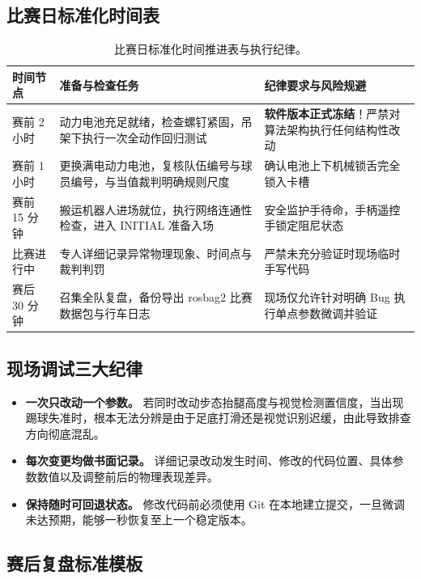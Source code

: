 \subsection{比赛日标准化时间表}

\begin{table}[H]
\centering
\small
\begin{tabularx}{\textwidth}{p{2.6cm} p{5.2cm} X}
\toprule
\textbf{时间节点} & \textbf{准备与检查任务} & \textbf{纪律要求与风险规避} \\
\midrule
赛前 2 小时 & 动力电池充足就绪，检查螺钉紧固，吊架下执行一次全动作回归测试 & \textbf{软件版本正式冻结}！严禁对算法架构执行任何结构性改动 \\
\addlinespace
赛前 1 小时 & 更换满电动力电池，复核队伍编号与球员编号，与当值裁判明确规则尺度 & 确认电池上下机械锁舌完全锁入卡槽 \\
\addlinespace
赛前 15 分钟 & 搬运机器人进场就位，执行网络连通性检查，进入 INITIAL 准备入场 & 安全监护手待命，手柄遥控手锁定阻尼状态 \\
\addlinespace
比赛进行中 & 专人详细记录异常物理现象、时间点与裁判判罚 & 严禁未充分验证时现场临时手写代码 \\
\addlinespace
赛后 30 分钟 & 召集全队复盘，备份导出 rosbag2 比赛数据包与行车日志 & 现场仅允许针对明确 Bug 执行单点参数微调并验证 \\
\bottomrule
\end{tabularx}
\caption{比赛日标准化时间推进表与执行纪律。\advice}
\end{table}

\subsection{现场调试三大纪律}

\begin{itemize}[leftmargin=*]
    \item \textbf{一次只改动一个参数。} 若同时改动步态抬腿高度与视觉检测置信度，当出现踢球失准时，根本无法分辨是由于足底打滑还是视觉识别迟缓，由此导致排查方向彻底混乱。
    \item \textbf{每次变更均做书面记录。} 详细记录改动发生时间、修改的代码位置、具体参数数值以及调整前后的物理表现差异。
    \item \textbf{保持随时可回退状态。} 修改代码前必须使用 Git 在本地建立提交，一旦微调未达预期，能够一秒恢复至上一个稳定版本。
\end{itemize}

\subsection{赛后复盘标准模板}

